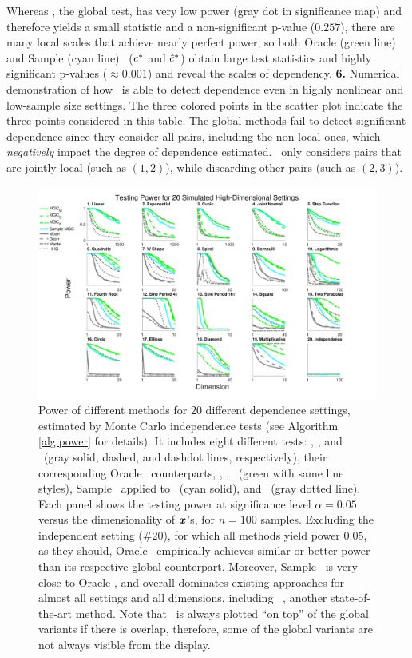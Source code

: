 \documentclass[11pt]{article}
\begin{document}
{Whereas \Mcorr, the global test, has very low power (gray dot in  significance map)
and therefore yields a small statistic and a non-significant p-value ($0.257$),  there are many local scales that achieve nearly perfect power, so both Oracle (green line) and Sample (cyan line) \Mgc~($c^{*}$ and $\hat{c}^{*}$) obtain large test statistics and highly significant p-values ($\approx 0.001$) and reveal the scales of dependency. 
\textbf{6.} Numerical demonstration of how \Mgc~is able to detect dependence even in highly nonlinear and low-sample size settings. The three colored points in the scatter plot indicate the three points considered in this table. 
The global methods fail to detect significant dependence since they consider all pairs, including the non-local ones, which \emph{negatively} impact the degree of dependence estimated.
\Mgc~only considers pairs that are jointly local (such as $(1,2)$), while discarding other pairs (such as $(2,3)$). 
}
\label{f:schematic}


\begin{figure}[htbp]
\includegraphics[width=1.0\textwidth,trim={0 0.5cm 3.2cm 0},clip]{Figures/FigHDPowerAll}
\caption{Power of different methods for $20$ different dependence settings, estimated by Monte Carlo independence tests (see Algorithm \ref{alg:power} for details). It includes eight different tests: \Mcorr, \Dcorr, and \Mantel~(gray solid, dashed, and dashdot lines, respectively), their corresponding Oracle \Mgc~counterparts, \Mgcm, \Mgcd, \Mgcp~(green with same line styles), Sample \Mgc~applied to \Mcorr~(cyan solid), and \Hhg~(gray dotted line). 
Each panel shows the testing power at significance level $\alpha=0.05$ versus the dimensionality of $\boldsymbol{x}$'s, for $n=100$ samples. 
Excluding the independent setting (\#20), for which all methods yield power $0.05$, as they should, Oracle \Mgc~empirically achieves similar or better power than its respective global counterpart. Moreover, Sample \Mgc~is very close to Oracle \Mgcm, and overall dominates existing approaches for almost all settings and all dimensions, including \Hhg~\cite{HellerGorfine2013}, another state-of-the-art method. Note that \Mgc~is always plotted ``on top'' of the global variants if there is overlap, therefore, some of the global variants are not always visible from the display.}
\label{f:nDAll}
\end{figure}
\end{document}

